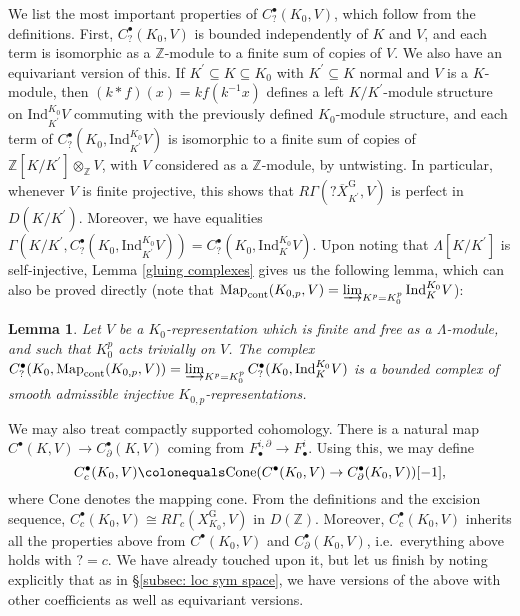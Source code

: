 \documentclass{amsart}
\newtheorem{lemma}[subsubsection]{Lemma}
\theoremstyle{remark}
\numberwithin{equation}{subsection}
\newcommand{\Z}{\ZZ}
\newcommand{\ZZ}{{\mathbb Z}}
\DeclareMathOperator{\Map}{Map}
\newcommand{\ol}{\overline}
\newcommand{\sub}{\subseteq}
\newcommand{\defeq}{\colonequals}
\renewcommand{\(}{\left(}
\renewcommand{\)}{\right)}
\begin{document}
We list the most important properties of $C_?^\bullet(K_0,V)$, which follow from the definitions. First, $C_?^\bullet(K_0,V)$ is bounded independently of $K$ and $V$, and each term is isomorphic as a $\Z$-module to a finite sum of copies of $V$. We also have an equivariant version of this. If $K^\prime \sub K \sub K_0$ with $K^\prime \sub K$ normal and $V$ is a $K$-module, then $(k\ast f)(x) = k f(k^{-1}x)$ defines a left $K/K^\prime$-module structure on $\mathrm{Ind}_{K^\prime}^{K_0}V$ commuting with the previously defined $K_0$-module structure, and each term of $C_?^\bullet(K_0,\mathrm{Ind}_{K^\prime}^{K_0}V)$ is isomorphic to a finite sum of copies of $\Z[K/K^\prime]\otimes_{\Z}V$, with $V$ considered as a $\Z$-module, by untwisting. In particular, whenever $V$ is finite projective, this shows that $R\Gamma(?\ol{X}^\mathrm{G}_{K^\prime},V)$ is perfect in $D(K/K^\prime)$. Moreover, we have equalities $\Gamma(K/K^\prime,C_?^\bullet(K_0,\mathrm{Ind}_{K^\prime}^{K_0}V)) = C^\bullet_?(K_0,\mathrm{Ind}_K^{K_0}V)$. Upon noting that $\Lambda[K/K^\prime]$ is self-injective, Lemma \ref{gluing complexes} gives us the following lemma, which can also be proved directly (note that $\Map_{\mathrm{cont}}(K_{0,p},V) = \varinjlim_{K^p=K_0^p} \mathrm{Ind}_K^{K_0}V$):

\begin{lemma}\label{perfect complex for completed cohomology}
Let $V$ be a $K_0$-representation which is finite and free as a $\Lambda$-module, and such that $K_0^p$ acts trivially on $V$. 
The complex $C_?^{\bullet}(K_0, \Map_{\mathrm{cont}}(K_{0,p},V)) = \varinjlim_{K^p=K_0^p} C_?^\bullet(K_0,\mathrm{Ind}_K^{K_0}V)$ is a bounded complex of smooth admissible 
injective $K_{0,p}$-representations.
\end{lemma} 

We may also treat compactly supported cohomology. There is a natural map $C^\bullet(K,V) \to C^\bullet_\partial(K,V)$ coming from $F_\bullet^{i,\partial} \to F_\bullet^{i}$. Using this, we may define
\[
C_c^\bullet(K_0,V) \defeq \mathrm{Cone}(C^\bullet(K_0,V) \to C^\bullet_\partial(K_0,V))[-1],
\]
where $\mathrm{Cone}$ denotes the mapping cone. From the definitions and the excision sequence, $C_c^\bullet(K_0,V) \cong R\Gamma_c(X^\mathrm{G}_{K_0},V)$ in $D(\Z)$. Moreover, $C_c^\bullet(K_0,V)$ inherits all the properties above from $C^\bullet(K_0,V)$ and $C^\bullet_\partial(K_0,V)$, i.e.\ everything above holds with $?=c$. We have already touched upon it, but let us finish by noting explicitly that as in \S \ref{subsec: loc sym space}, we have versions of the above with other coefficients as well as equivariant versions.
\end{document}
